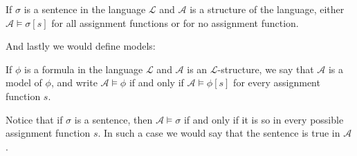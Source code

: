 \documentclass[9pt,a4paper, twocolumn]{article}
\newcommand{\curveL}{\mathcal{L}}
\newcommand{\curveA}{\mathcal{A}}
\begin{document}
            \begin{corollary}
                If $\sigma$ is a sentence in the language $\curveL$ and $\curveA$ is a structure of the language, either $\curveA\vDash \sigma[s]$ for all assignment functions or for no assignment function.
            \end{corollary}
            And lastly we would define models:
            \begin{define}
                If $\phi$ is a formula in the language $\curveL$ and $\curveA$ is an $\curveL$-structure, we say that $\curveA$ is a model of $\phi$, and write $\curveA\vDash \phi$ if and only if $\curveA\vDash\phi[s]$ for every assignment function $s$. 
            \end{define}
            Notice that if $\sigma$ is a sentence, then $\curveA\vDash\sigma$ if and only if it is so in every possible assignment function $s$. In such a case we would say that the sentence is true in $\curveA$.
\end{document}
